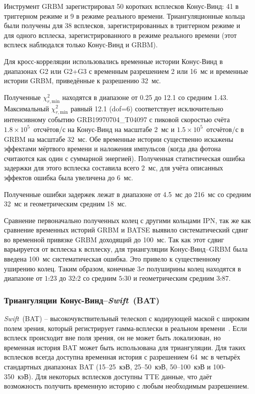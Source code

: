 Инструмент GRBM зарегистрировал 50 коротких всплесков Конус-Винд: 41 в триггерном 
режиме и 9 в режиме реального времени. Триангуляционные кольца были получены для 38 всплесков,
зарегистрированных в триггерном режиме и для одного всплеска, зарегистрированного 
в режиме реального времени (этот всплеск наблюдался только Конус-Винд и GRBM).

Для кросс-корреляции использовались временные истории Конус-Винд в диапазонах G2 
или G2+G3 с временным разрешением 2 или 16~мс и временные истории GRBM, 
приведённые к разрешению 32~мс.

Полученные $\chi^2_{r,\textrm{min}}$ находятся в диапазоне от 0.25 до 12.1 со 
средним 1.43. Максимальный $\chi^2_{r,\textrm{min}}$ равный 12.1 (dof=6) 
соответствует исключительно интенсивному событию GRB19970704\_T04097 с пиковой 
скоростью счёта $1.8\times10^5$~отсчётов/с на Конус-Винд на масштабе 2~мс 
и $1.5\times10^5$~отсчётов/с в GRBM на масштабе 32~мс. Обе временные истории 
существенно искажены эффектами мёртвого времени и наложения импульсов 
(когда два фотона считаются как один с суммарной энергией). Полученная статистическая 
ошибка задержки для этого всплеска составила всего 2~мс, для учёта описанных 
эффектов ошибка была увеличена до 6~мс.

Полученные ошибки задержек лежат в диапазоне от 4.5~мс до 216~мс со средним 32~мс 
и геометрическим средним 18~мс.

Сравнение первоначально полученных колец с другими кольцами IPN, так же как 
сравнение временных историй GRBM и BATSE выявило систематический сдвиг во 
временной привязке GRBM доходящий до 100~мс. Так как этот сдвиг варьируется от 
всплеска к всплеску, для триангуляции Конус-Винд--GRBM была введена 100~мс 
систематическая ошибка. Это привело к существенному уширению колец. Таким образом, 
конечные $3\sigma$ полуширины колец находятся в диапазоне от $1\overset{\circ}{.}23$ 
до $32\overset{\circ}{.}2$ со средним $5\overset{\circ}{.}30$ и геометрическим 
средним $3\overset{\circ}{.}87$.

\subsubsection{Триангуляции Конус-Винд--\textit{Swift}~(BAT)}
\textit{Swift}~(BAT) -- высокочувствительный телескоп с кодирующей маской с 
широким полем зрения, который регистрирует гамма-всплески в реальном 
времени~\citep{Barthelmy_2005SSRv}. Если всплеск происходит вне поля зрения, 
он не может быть локализован, но временная история BAT может быть использована 
для триангуляции. Для таких всплесков всегда доступна временная история 
с разрешением 64~мс в четырёх стандартных диапазонах BAT (15--25~кэВ, 25--50~кэВ, 
50--100~кэВ и 100-350~кэВ). Для некоторых всплесков доступны TTE данные, что 
даёт возможность получить временную историю с любым необходимым разрешением.

